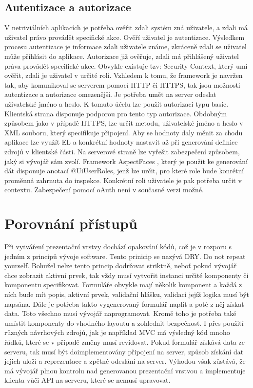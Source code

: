 \subsection{Autentizace a autorizace}
V netriviálních aplikacích je potřeba ověřit zdali systém zná uživatele, a zdali má uživatel právo provádět specifické akce. Ověří uživatel je autentizace. Výsledkem procesu autentizace je informace zdali uživatele známe, zkráceně zdali se uživatel může přihlásit do aplikace. Autorizace již ověřuje, zdali má přihlášený uživatel práva provádět specifické akce. Obvykle existuje tzv: Security Context, který umí ověřit, zdali je uživatel v určité roli. Vzhledem k tomu, že framework je navržen tak, aby komunikoval se serverem pomocí HTTP či HTTPS, tak jsou možnosti autentizace a autorizace omezenější. Je potřeba umět na server odeslat uživatelské jméno a heslo. K tomuto účelu lze použít autorizaci typu basic. Klientská strana disponuje podporou pro tento typ autorizace. Obdobným způsobem jako v případě HTTPS, lze určit metodu, uživatelské jméno a heslo v XML souboru, který specifikuje připojení. Aby se hodnoty daly měnit za chodu aplikace lze využít EL a konkrétní hodnoty nastavit až při generování definice zdrojů v klientské části. Na serverové straně lze vyřešit zabezpečení způsobem, jaký si vývojář sám zvolí. Framework AspectFaces \cite{aspectFaces}, který je použit ke generování dát disponuje anotací @UiUserRoles, jenž lze určit, pro které role bude konrétní proměnná zahrnuta do inspekce. Konkrétní roli uživatele je pak potřeba určit v contextu. Zabezpečení pomocí oAuth není v současné verzi možné. 

\section{Porovnání přístupů}
Při vytváření prezentační vrstvy dochází opakování kódů, což je v rozporu s jedním z principů vývoje software. Tento prinicip se nazývá DRY. Do not repeat yourself. Bohužel nelze tento princip dodržovat striktně, neboť pokud vývojář chce zobrazit aktivní prvek, tak vždy musí vytvořit instanci určité komponenty či komponentu specifikovat. Formuláře obvykle mají několik komponent a každá z ních bude mít popis, aktivní prvek, validační hlášku, validaci jejíž logika musí být napsána. Dále je potřeba takto vygenerovaný formulář naplit a poté z něj získat data. Toto všechno musí vývojář naprogramovat. Kromě toho je potřeba také umístit komponenty do vhodného layoutu a zohlednit bezpečnost. I přes použití různých návrhových zdrojů, jak je například MVC má výsledný kód mnoho řádků, které se v případě změny musí revidovat. Pokud formulář získává data ze serveru, tak musí být doimplementovány připojení na server, způsob získání dat jejich uloží a reprezentace a zpětné odeslání na server. Výhodou však zůstává, že má vývojář plnou kontrolu nad generovanou prezentační vrstvou a implementuje klienta vůči API na serveru, které se nemusí upravovat.

